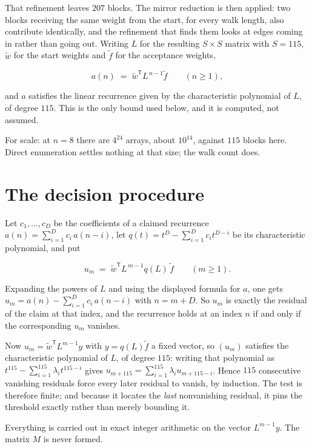 \documentclass[11pt]{article}
\theoremstyle{definition}
\begin{document}
That refinement leaves $207$ blocks. The mirror reduction is then applied: two blocks receiving the same weight from the start, for every walk length, also contribute identically, and the refinement that finds them looks at edges coming in rather than going out. Writing $L$ for the resulting $S \times S$ matrix with $S = 115$, $\tilde w$ for the start weights and $\tilde f$ for the acceptance weights,

\[a(n) \;=\; \tilde w^{\mathsf T} L^{\,n-1} \tilde f \qquad (n \ge 1),\]

and $a$ satisfies the linear recurrence given by the characteristic polynomial of $L$, of degree $115$. This is the only bound used below, and it is computed, not assumed.

For scale: at $n = 8$ there are $4^{24}$ arrays, about $10^{14}$, against $115$ blocks here. Direct enumeration settles nothing at that size; the walk count does.

\section{The decision procedure}

Let $c_1,\dots,c_D$ be the coefficients of a claimed recurrence $a(n) = \sum_{i=1}^{D} c_i\,a(n-i)$, let $q(t) = t^{D} - \sum_{i=1}^{D} c_i t^{D-i}$ be its characteristic polynomial, and put

\[u_m \;=\; \tilde w^{\mathsf T} L^{\,m-1} q(L)\,\tilde f \qquad (m \ge 1).\]

Expanding the powers of $L$ and using the displayed formula for $a$, one gets $u_m = a(n) - \sum_{i=1}^{D} c_i\,a(n-i)$ with $n = m + D$. So $u_m$ is exactly the residual of the claim at that index, and the recurrence holds at an index $n$ if and only if the corresponding $u_m$ vanishes.

Now $u_m = \tilde w^{\mathsf T} L^{m-1} y$ with $y = q(L)\tilde f$ a fixed vector, so $(u_m)$ satisfies the characteristic polynomial of $L$, of degree $115$: writing that polynomial as $t^{115} - \sum_{i=1}^{115} \lambda_i t^{115-i}$ gives $u_{m+115} = \sum_{i=1}^{115} \lambda_i u_{m+115-i}$. Hence $115$ consecutive vanishing residuals force every later residual to vanish, by induction. The test is therefore finite; and because it locates the {\itshape last} nonvanishing residual, it pins the threshold exactly rather than merely bounding it.

Everything is carried out in exact integer arithmetic on the vector $L^{m-1}y$. The matrix $M$ is never formed.
\end{document}
